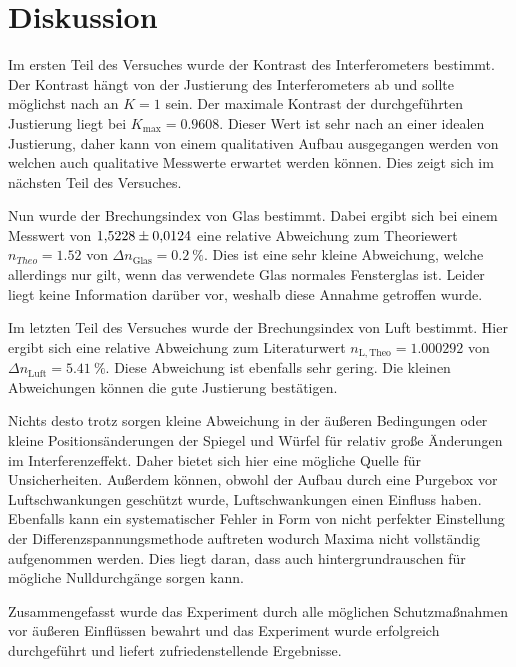 \chapter{Diskussion}
\label{cha:Diskussion}
Im ersten Teil des Versuches wurde der Kontrast des Interferometers bestimmt. Der Kontrast hängt von der Justierung des Interferometers ab und sollte möglichst nach an $K = 1$ sein.
Der maximale Kontrast der durchgeführten Justierung liegt bei $K_\mathrm{max} = 0.9608$. Dieser Wert ist sehr nach an einer idealen Justierung, daher kann von einem qualitativen Aufbau
ausgegangen werden von welchen auch qualitative Messwerte erwartet werden können. Dies zeigt sich im nächsten Teil des Versuches. 

Nun wurde der Brechungsindex von Glas bestimmt. Dabei
ergibt sich bei einem Messwert von $\num{1.5228 \pm 0.0124}$ eine relative Abweichung zum Theoriewert $n_{Theo} = \num{1.52}$\cite{phy-chem-eigenschaften} von $\Delta n_\mathrm{Glas} = \qty{0.2}{\percent}$. Dies ist eine sehr kleine Abweichung, 
welche allerdings nur gilt, wenn das verwendete Glas normales Fensterglas ist. Leider liegt keine Information darüber vor, weshalb diese Annahme getroffen wurde.

Im letzten Teil des Versuches wurde der Brechungsindex von Luft bestimmt. Hier ergibt sich eine relative Abweichung zum Literaturwert $n_{\mathrm{L,Theo}} = 1.000292$ \cite{Ingenieurwissen} von $\Delta n_\mathrm{Luft} = \qty{5.41}{\percent}$.
Diese Abweichung ist ebenfalls sehr gering. Die kleinen Abweichungen können die gute Justierung bestätigen. 

Nichts desto trotz sorgen kleine Abweichung in der äußeren Bedingungen oder kleine Positionsänderungen der Spiegel und Würfel für relativ große Änderungen im Interferenzeffekt. Daher 
bietet sich hier eine mögliche Quelle für Unsicherheiten. Außerdem können, obwohl der Aufbau durch eine Purgebox vor Luftschwankungen geschützt wurde, Luftschwankungen einen Einfluss haben.
Ebenfalls kann ein systematischer Fehler in Form von nicht perfekter Einstellung der Differenzspannungsmethode auftreten wodurch Maxima nicht vollständig aufgenommen werden. Dies liegt 
daran, dass auch hintergrundrauschen für mögliche Nulldurchgänge sorgen kann.

Zusammengefasst wurde das Experiment durch alle möglichen Schutzmaßnahmen vor äußeren Einflüssen bewahrt und das Experiment wurde erfolgreich durchgeführt und liefert zufriedenstellende Ergebnisse. 
